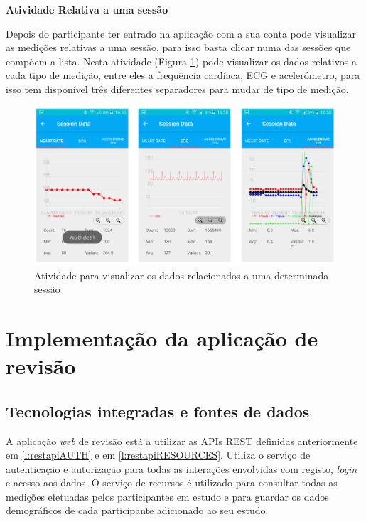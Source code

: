 \par
\textbf{Atividade Relativa a uma sessão}
\par
Depois do participante ter entrado na aplicação com a sua conta pode visualizar as medições relativas a uma sessão, para isso basta clicar numa das sessões que compõem a lista. Nesta atividade (Figura \ref{f:read_data}) pode visualizar os dados relativos a cada tipo de medição, entre eles a frequência cardíaca, \gls{ECG} e acelerómetro, para isso tem disponível três diferentes separadores para mudar de tipo de medição. 
\begin{figure}[H]
\centering
\includegraphics[height=0.4\textwidth]{imgs/read_data.png}
\caption[Atividade para visualizar os dados relacionados a uma determinada sessão]{Atividade para visualizar os dados relacionados a uma determinada sessão}
\label{f:read_data}
\end{figure}

\section{Implementação da aplicação de revisão}
\subsection{Tecnologias integradas e fontes de dados}

A aplicação \textit{web} de revisão está a utilizar as \gls{API}s \gls{REST} definidas anteriormente em \ref{l:restapiAUTH} e em \ref{l:restapiRESOURCES}. Utiliza o serviço de autenticação e autorização para todas as interações envolvidas com registo, \textit{login} e acesso aos dados. O serviço de recursos é utilizado para consultar todas as medições efetuadas pelos participantes em estudo e para guardar os dados demográficos de cada participante adicionado ao seu estudo.\par

